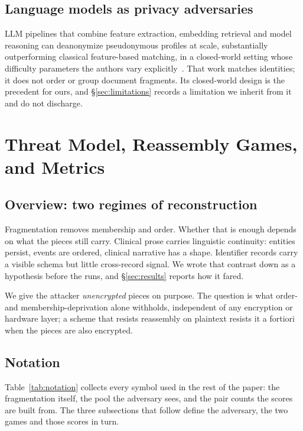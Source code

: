 \documentclass[sigconf,review]{acmart}
\begin{document}
\subsection{Language models as privacy adversaries}
LLM pipelines that combine feature extraction, embedding retrieval and model
reasoning can deanonymize pseudonymous profiles at scale, substantially
outperforming classical feature-based matching, in a closed-world setting
whose difficulty parameters the authors vary
explicitly~\cite{lermen2026}. That work matches identities; it does not order or
group document fragments. Its closed-world design is the precedent for ours,
and \S\ref{sec:limitations} records a limitation we inherit from it and do not
discharge.

\section{Threat Model, Reassembly Games, and Metrics}
\label{sec:model}

\subsection{Overview: two regimes of reconstruction}
\label{sec:overview}
Fragmentation removes membership and order. Whether that is enough depends on
what the pieces still carry. Clinical prose carries linguistic continuity:
entities persist, events are ordered, clinical narrative has a shape.
Identifier records carry a visible schema but little cross-record signal. We
wrote that contrast down as a hypothesis before the runs, and \S\ref{sec:results}
reports how it fared.

We give the attacker \emph{unencrypted} pieces on purpose. The question is what
order- and membership-deprivation alone withholds, independent of any
encryption or hardware layer; a scheme that resists reassembly on plaintext
resists it a fortiori when the pieces are also encrypted.

\subsection{Notation}
\label{sec:notation}
Table~\ref{tab:notation} collects every symbol used in the rest of the paper:
the fragmentation itself, the pool the adversary sees, and the pair counts the
scores are built from. The three subsections that follow define the adversary,
the two games and those scores in turn.
\end{document}
